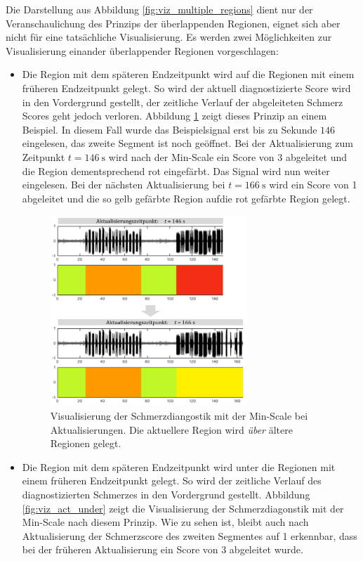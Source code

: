 Die Darstellung aus Abbildung \ref{fig:viz_multiple_regions} dient nur der Veranschaulichung des Prinzips der überlappenden Regionen, eignet sich aber nicht für eine tatsächliche Visualisierung. Es werden zwei Möglichkeiten zur Visualisierung einander überlappender Regionen vorgeschlagen:
\begin{itemize}
\item Die Region mit dem späteren Endzeitpunkt wird \glqq auf\grqq{} die Regionen mit einem früheren Endzeitpunkt gelegt. So wird der aktuell diagnostizierte Score wird in den Vordergrund gestellt, der zeitliche Verlauf der abgeleiteten Schmerz Scores geht jedoch verloren. Abbildung \ref{fig:viz_act_over} zeigt dieses Prinzip an einem Beispiel. In diesem Fall wurde das Beispielsignal erst bis zu Sekunde $146$ eingelesen, das zweite Segment ist noch geöffnet. Bei der Aktualisierung zum Zeitpunkt $t=\SI{146}{\second}$ wird nach der Min-Scale ein Score von 3 abgeleitet und die Region dementsprechend rot eingefärbt. Das Signal wird nun weiter eingelesen. Bei der nächsten Aktualisierung bei $t=\SI{166}{\second}$ wird ein Score von 1 abgeleitet und die so gelb gefärbte Region \glqq auf\grqq die rot gefärbte Region gelegt.

\begin{figure}[h]
	\centering
	\includegraphics[width=0.7\textwidth]{bilder/viz_act_over.png}
	\caption{Visualisierung der Schmerzdiangostik mit der Min-Scale bei Aktualisierungen. Die aktuellere Region wird \emph{über} ältere Regionen gelegt.}
	\label{fig:viz_act_over}
\end{figure}

\item Die Region mit dem späteren Endzeitpunkt wird \glqq unter\grqq{} die Regionen mit einem früheren Endzeitpunkt gelegt. So wird der zeitliche Verlauf des diagnostizierten Schmerzes in den Vordergrund gestellt. Abbildung \ref{fig:viz_act_under} zeigt die Visualisierung der Schmerzdiagonstik mit der Min-Scale nach diesem Prinzip. Wie zu sehen ist, bleibt auch nach Aktualisierung der Schmerzscore des zweiten Segmentes auf 1 erkennbar, dass bei der früheren Aktualisierung ein Score von 3 abgeleitet wurde.


\end{itemize}
